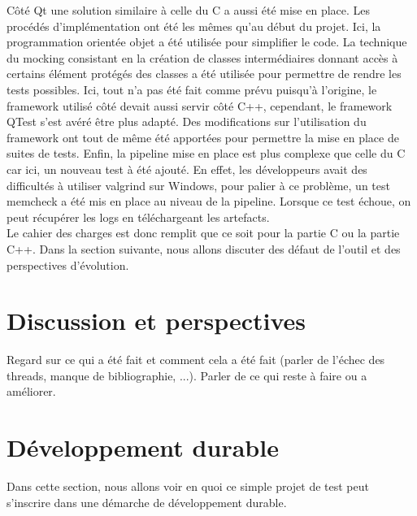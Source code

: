 \documentclass[a4paper]{article}
\begin{document}
Côté Qt une solution similaire à celle du C a aussi été mise en place. Les
procédés d'implémentation ont été les mêmes qu'au début du projet. Ici, la
programmation orientée objet a été utilisée pour simplifier le code. La
technique du mocking consistant en la création de classes intermédiaires
donnant accès à certains élément protégés des classes a été utilisée pour
permettre de rendre les tests possibles. Ici, tout n'a pas été fait comme prévu
puisqu'à l'origine, le framework utilisé côté devait aussi servir côté C++,
cependant, le framework QTest s'est avéré être plus adapté. Des modifications
sur l'utilisation du framework ont tout de même été apportées pour permettre la
mise en place de suites de tests. Enfin, la pipeline mise en place est plus
complexe que celle du C car ici, un nouveau test à été ajouté. En effet, les
développeurs avait des difficultés à utiliser valgrind sur Windows, pour palier
à ce problème, un test memcheck a été mis en place au niveau de la pipeline.
Lorsque ce test échoue, on peut récupérer les logs en téléchargeant les
artefacts.\\

Le cahier des charges est donc remplit que ce soit pour la partie C ou la partie
C++. Dans la section suivante, nous allons discuter des défaut de l'outil et des
perspectives d'évolution.

\clearpage

\section{Discussion et perspectives}

Regard sur ce qui a été fait et comment cela a été fait (parler de l'échec
des threads, manque de bibliographie, ...). Parler de ce qui reste à faire ou a
améliorer.

\clearpage

\section{Développement durable}

Dans cette section, nous allons voir en quoi ce simple projet de test peut
s'inscrire dans une démarche de développement durable.\\
\end{document}
